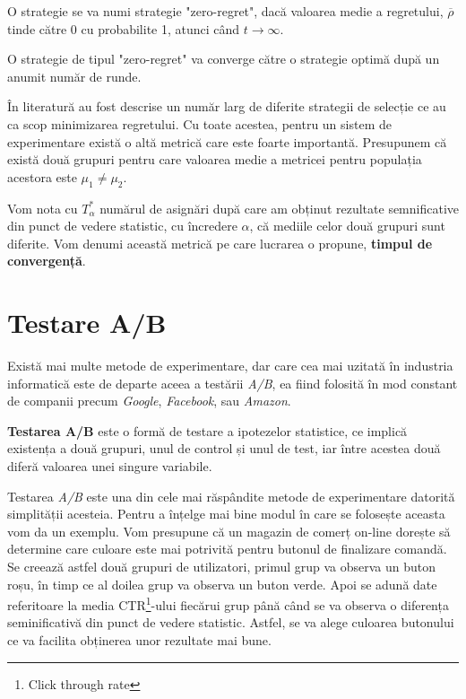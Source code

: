 \begin{definition}
	O strategie se va numi strategie "zero-regret", dacă valoarea medie a regretului, $\overline{\rho}$ tinde către 0 cu probabilite 1, atunci când $t \to \infty$.
\end{definition}

\begin{remark}
	O strategie de tipul "zero-regret" va converge către o strategie optimă după un anumit număr de runde.
\end{remark}

În literatură au fost descrise un număr larg de diferite strategii de selecție ce au ca scop minimizarea regretului. Cu toate acestea, pentru un sistem de experimentare există o altă metrică care este foarte importantă. Presupunem că există două grupuri pentru care valoarea medie a metricei pentru populația acestora este $\mu_1 \neq \mu_2$.

\begin{definition}
	Vom nota cu $T_{\alpha}^*$ numărul de asignări după care am obținut rezultate semnificative din punct de vedere statistic, cu încredere $\alpha$, că mediile celor două grupuri sunt diferite. Vom denumi această metrică pe care lucrarea o propune, \textbf{timpul de convergență}.
\end{definition}

\section{Testare A/B}

Există mai multe metode de experimentare, dar care cea mai uzitată în industria informatică este de departe aceea a testării \textit{A/B}, ea fiind folosită în mod constant de companii precum \textit{Google}, \textit{Facebook}, sau \textit{Amazon}. 

\begin{definition}
	\textbf{Testarea A/B} este o formă de testare a ipotezelor statistice, ce implică existența a două grupuri, unul de control și unul de test, iar între acestea două diferă valoarea unei singure variabile.
\end{definition}

Testarea \textit{A/B} este una din cele mai răspândite metode de experimentare datorită simplității acesteia. Pentru a înțelge mai bine modul în care se folosește aceasta vom da un exemplu. Vom presupune că un magazin de comerț on-line dorește să determine care culoare este mai potrivită pentru butonul de finalizare comandă. Se creează astfel două grupuri de utilizatori, primul grup va observa un buton roșu, în timp ce al doilea grup va observa un buton verde. Apoi se adună date referitoare la media CTR\footnote{Click through rate}-ului fiecărui grup până când se va observa o diferența seminificativă din punct de vedere statistic. Astfel, se va alege culoarea butonului ce va facilita obținerea unor rezultate mai bune. 

